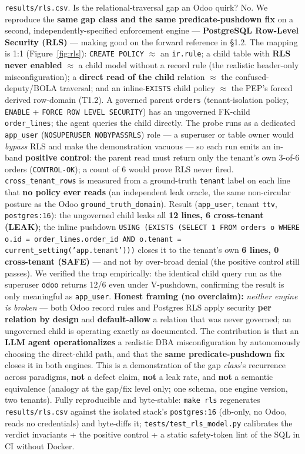 \documentclass[11pt,a4paper]{article}
\newcommand{\code}[1]{\texttt{#1}}
\begin{document}
\code{results/rls.csv}. Is the relational-traversal gap an Odoo quirk? No. We reproduce the \textbf{same gap
class and the same predicate-pushdown fix} on a second, independently-specified enforcement engine ---
\textbf{PostgreSQL Row-Level Security (RLS)} --- making good on the forward reference in \S1.2. The mapping is
1:1 (Figure~\ref{fig:rls}): \code{CREATE POLICY} $\approx$ an \code{ir.rule}; a child table with \textbf{RLS
never enabled} $\approx$ a child model without a record rule (the realistic header-only misconfiguration); a
\textbf{direct read of the
child} relation $\approx$ the confused-deputy/BOLA traversal; and an inline-\code{EXISTS} child policy
$\approx$ the PEP's forced derived row-domain (T1.2). A governed parent \code{orders} (tenant-isolation policy,
\code{ENABLE} + \code{FORCE ROW LEVEL SECURITY}) has an ungoverned FK-child \code{order\_lines}; the agent
queries the child directly. The probe runs as a dedicated \code{app\_user} (\code{NOSUPERUSER NOBYPASSRLS})
role --- a superuser or table owner would \emph{bypass} RLS and make the demonstration vacuous --- so each run
emits an in-band \textbf{positive control}: the parent read must return only the tenant's own 3-of-6 orders
(\code{CONTROL-OK}); a count of 6 would prove RLS never fired. \code{cross\_tenant\_rows} is measured from a
ground-truth \code{tenant} label on each line that \textbf{no policy ever reads} (an independent leak oracle,
the same non-circular posture as the Odoo \code{ground\_truth\_domain}). Result (\code{app\_user}, tenant
\code{ttv}, \code{postgres:16}): the ungoverned child leaks all \textbf{12 lines, 6 cross-tenant (LEAK)}; the
inline pushdown \code{USING (EXISTS (SELECT 1 FROM orders o WHERE o.id = order\_lines.order\_id AND o.tenant =
current\_setting('app.tenant')))} closes it to the tenant's own \textbf{6 lines, 0 cross-tenant (SAFE)} --- and
not by over-broad denial (the positive control still passes). We verified the trap empirically: the identical
child query run as the superuser \code{odoo} returns 12/6 even under V-pushdown, confirming the result is only
meaningful as \code{app\_user}. \textbf{Honest framing (no overclaim):} \emph{neither engine is broken} --- both
Odoo record rules and Postgres RLS apply security \textbf{per relation by design} and \textbf{default-allow} a
relation that was never governed; an ungoverned child is operating exactly as documented. The contribution is
that an \textbf{LLM agent operationalizes} a realistic DBA misconfiguration by autonomously choosing the
direct-child path, and that the \textbf{same predicate-pushdown fix} closes it in both engines. This is a
demonstration of the gap \emph{class}'s recurrence across paradigms, \textbf{not} a defect claim, \textbf{not} a
leak rate, and \textbf{not} a semantic equivalence (analogy at the gap/fix level only; one schema, one engine
version, two tenants). Fully reproducible and byte-stable: \code{make rls} regenerates \code{results/rls.csv}
against the isolated stack's \code{postgres:16} (db-only, no Odoo, reads no credentials) and byte-diffs it;
\code{tests/test\_rls\_model.py} calibrates the verdict invariants + the positive control + a static
safety-token lint of the SQL in CI without Docker.
\end{document}
